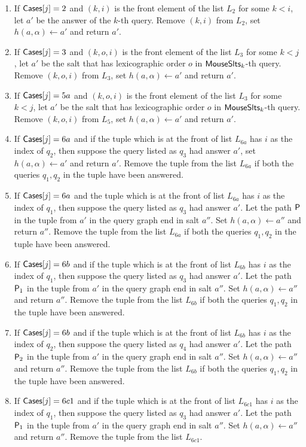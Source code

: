 \begin{enumerate}
\begin{enumerate}[label=(\roman*)]
  \item If $\mathsf{Cases}[j]=2$ and $(k,i)$ is the front element of the list $L_2$ for some $k<i$, let $a'$ be the answer of the $k$-th query. Remove $(k,i)$ from $L_2$, set $h(a,\alpha)\gets a'$ and return $a'$.
  \item If $\mathsf{Cases}[j]=3$ and $(k,o,i)$ is the front element of the list $L_3$ for some $k<j$, let $a'$ be the salt that has lexicographic order $o$ in $\mathsf{MouseSlts}_k$-th query. Remove $(k,o,i)$ from $L_3$, set $h(a,\alpha)\gets a'$ and return $a'$.
  \item If $\mathsf{Cases}[j]=5a$ and $(k,o,i)$ is the front element of the list $L_3$ for some $k<j$, let $a'$ be the salt that has lexicographic order $o$ in $\mathsf{MouseSlts}_k$-th query. Remove $(k,o,i)$ from $L_5$, set $h(a,\alpha)\gets a'$ and return $a'$.
  \item If $\mathsf{Cases}[j]=6a$ and if the tuple which is at the front of list $L_{6a}$ has $i$ as the index of $q_2$, then suppose the query listed as $q_3$ had answer $a'$, set $h(a,\alpha)\gets a'$ and return $a'$. Remove the tuple  from the list $L_{6a}$ if both the queries $q_1,q_2$ in the tuple have been answered.
  \item If $\mathsf{Cases}[j]=6a$ and the tuple which is at the front of list $L_{6a}$ has $i$ as the index of $q_1$, then suppose the query listed as $q_3$ had answer $a'$. Let the path $\mathsf{P}$ in the tuple from $a'$ in the query graph end in salt $a''$. Set $h(a,\alpha)\gets a''$ and return $a''$. Remove the tuple from the list $L_{6a}$ if both the queries $q_1,q_2$ in the tuple have been answered.
  \item If $\mathsf{Cases}[j]=6b$ and if the tuple which is at the front of list $L_{6b}$ has $i$ as the index of $q_1$, then suppose the query listed as $q_3$ had answer $a'$. Let the path $\mathsf{P}_1$ in the tuple from $a'$ in the query graph end in salt $a''$. Set $h(a,\alpha)\gets a''$ and return $a''$. Remove the tuple from the list $L_{6b}$ if both the queries $q_1,q_2$ in the tuple have been answered.
  \item If $\mathsf{Cases}[j]=6b$ and if the tuple which is at the front of list $L_{6b}$ has $i$ as the index of $q_2$, then suppose the query listed as $q_4$ had answer $a'$. Let the path $\mathsf{P}_2$ in the tuple from $a'$ in the query graph end in salt $a''$. Set $h(a,\alpha)\gets a''$ and return $a''$. Remove the tuple from the list $L_{6b}$ if both the queries $q_1,q_2$ in the tuple have been answered.
  \item If $\mathsf{Cases}[j]=6c1$ and if the tuple which is at the front of list $L_{6c1}$ has $i$ as the index of $q_1$, then suppose the query listed as $q_3$ had answer $a'$. Let the path $\mathsf{P}_1$ in the tuple from $a'$ in the query graph end in salt $a''$. Set $h(a,\alpha)\gets a''$ and return $a''$. Remove the tuple from the list $L_{6c1}$.

\end{enumerate}
\end{enumerate}
